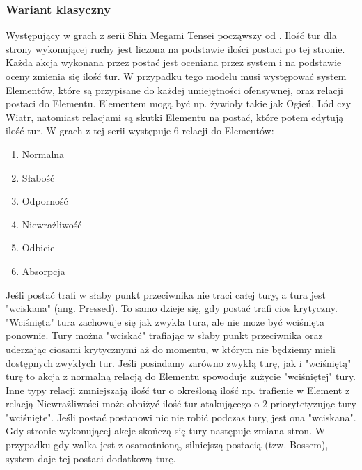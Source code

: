 \documentclass{SGGW-thesis}
\begin{document}
\subsubsection{Wariant klasyczny}
Występujący w grach z serii Shin Megami Tensei począwszy od \cite{SMT3}. Ilość tur dla strony wykonującej ruchy jest liczona na podstawie ilości postaci po tej stronie. Każda akcja wykonana przez postać jest oceniana przez system i na podstawie oceny zmienia się ilość tur. W przypadku tego modelu musi występować system 
Elementów, które są przypisane do każdej umiejętności ofensywnej, oraz relacji postaci do Elementu. Elementem mogą być np. żywioły takie jak Ogień, Lód czy Wiatr, natomiast relacjami są skutki Elementu na postać, które potem edytują ilość tur. W grach z tej serii występuje 6 relacji do Elementów:
\begin{enumerate}
  \item{Normalna}
  \item{Słabość}
  \item{Odporność}
  \item{Niewrażliwość}
  \item{Odbicie}
  \item{Absorpcja}
\end{enumerate}
Jeśli postać trafi w słaby punkt przeciwnika nie traci całej tury, a tura jest "wciskana" (ang. Pressed). To samo dzieje się, gdy postać trafi cios krytyczny. "Wciśnięta" tura zachowuje się jak zwykła tura, ale nie może być wciśnięta ponownie. Tury można "wciskać" trafiając w słaby punkt przeciwnika oraz uderzając ciosami krytycznymi aż do momentu, w którym nie będziemy mieli dostępnych zwykłych tur.
Jeśli posiadamy zarówno zwykłą turę, jak i "wciśniętą" turę to akcja z normalną relacją do Elementu spowoduje zużycie "wciśniętej" tury. Inne typy relacji zmniejszają ilość tur o określoną ilość np. trafienie w Element z relacją Niewrażliwości może obniżyć ilość tur atakującego o 2 priorytetyzując tury "wciśnięte".
Jeśli postać postanowi nic nie robić podczas tury, jest ona "wciskana". Gdy stronie wykonującej akcje skończą się tury następuje zmiana stron. W przypadku gdy walka jest z osamotnioną, silniejszą postacią (tzw. Bossem), system daje tej postaci dodatkową turę.
\end{document}
